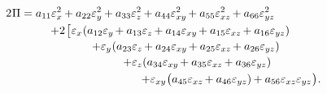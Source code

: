 \nopagebreak\vspace{-0.2em}
\begin{equation}\label{elasticenergylooongcartesian}
\begin{gathered}
\hspace{-5em}
2 \hspace{.1ex} \potential
= a_{11} \varepsilon^2_{x} \hspace{-0.1ex}
+ a_{22} \varepsilon^2_{y} \hspace{-0.1ex}
+ a_{33} \varepsilon^2_{z} \hspace{-0.1ex}
+ a_{44} \varepsilon^2_{xy} \hspace{-0.2ex}
+ a_{55} \varepsilon^2_{xz} \hspace{-0.2ex}
+ a_{66} \varepsilon^2_{yz}
\\[-0.1em]
%
\hspace{.2em}
+ 2 \hspace{.2ex} \bigl[ \hspace{.1ex}
\varepsilon_{x} \hspace{.1ex}
( a_{12} \varepsilon_{y} \hspace{-0.2ex}
+ a_{13} \varepsilon_{z} \hspace{-0.2ex}
+ a_{14} \varepsilon_{xy} \hspace{-0.2ex}
+ a_{15} \varepsilon_{xz} \hspace{-0.2ex}
+ a_{16} \varepsilon_{yz} ) \hspace{-0.11ex}
\\[-0.1em]
%
\hspace{3em}
+ \varepsilon_{y} \hspace{.1ex} (
a_{23} \varepsilon_{z} \hspace{-0.2ex}
+ a_{24} \varepsilon_{xy} \hspace{-0.2ex}
+ a_{25} \varepsilon_{xz} \hspace{-0.2ex}
+ a_{26} \varepsilon_{yz}
)
\\[-0.1em]
%
\hspace{5em}
+ \varepsilon_{z} ( a_{34} \varepsilon_{xy} \hspace{-0.2ex}
+ a_{35} \varepsilon_{xz} \hspace{-0.2ex}
+ a_{36} \varepsilon_{yz} )
\\[-0.1em]
%
\hspace{11em}
+ \varepsilon_{xy} \hspace{.1ex} \bigl(
a_{45} \varepsilon_{xz} \hspace{-0.2ex}
+ a_{46} \varepsilon_{yz} ) \hspace{-0.11ex}
+ a_{56} \varepsilon_{xz} \varepsilon_{yz} \hspace{.1ex}
\bigr)
\hspace{.1ex}
.
\end{gathered}
\end{equation}


